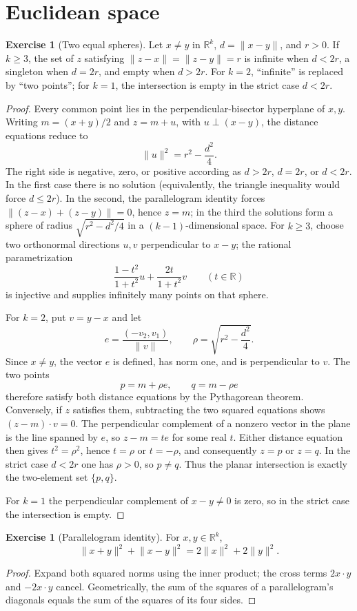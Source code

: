 \documentclass[12pt]{article}
\theoremstyle{definition}
\newtheorem{exercise}[theorem]{Exercise}
\newcommand{\R}{\mathbb R}
\newcommand{\norm}[1]{\lVert#1\rVert}
\begin{document}
\section{Euclidean space}
\begin{exercise}[Two equal spheres]
Let $x\ne y$ in $\R^k$, $d=\norm{x-y}$, and $r>0$.  If $k\ge3$, the
set of $z$ satisfying $\norm{z-x}=\norm{z-y}=r$ is infinite when
$d<2r$, a singleton when $d=2r$, and empty when $d>2r$.
For $k=2$, ``infinite'' is replaced by ``two points''; for $k=1$, the
intersection is empty in the strict case $d<2r$.
\end{exercise}
\begin{proof}
Every common point lies in the perpendicular-bisector hyperplane of
$x,y$.  Writing $m=(x+y)/2$ and $z=m+u$, with
$u\perp(x-y)$, the distance equations reduce to
\[
 \norm u^2=r^2-\frac{d^2}{4}.
\]
The right side is negative, zero, or positive according as $d>2r$,
$d=2r$, or $d<2r$.  In the first case there is no solution (equivalently,
the triangle inequality would force $d\le 2r$).  In the second, the
parallelogram identity forces $\norm{(z-x)+(z-y)}=0$, hence $z=m$; in the
third the solutions form a sphere
of radius $\sqrt{r^2-d^2/4}$ in a $(k-1)$-dimensional space.  For $k\ge3$,
choose two orthonormal directions $u,v$ perpendicular to $x-y$; the
rational parametrization
\[
 \frac{1-t^2}{1+t^2}u+\frac{2t}{1+t^2}v\qquad(t\in\R)
\]
is injective and supplies infinitely many points on that sphere.

For $k=2$, put $v=y-x$ and let
\[
 e=\frac{(-v_2,v_1)}{\norm v},\qquad
 \rho=\sqrt{r^2-\frac{d^2}{4}}.
\]
Since $x\ne y$, the vector $e$ is defined, has norm one, and is
perpendicular to $v$.  The two points
\[
 p=m+\rho e,\qquad q=m-\rho e
\]
therefore satisfy both distance equations by the Pythagorean theorem.
Conversely, if $z$ satisfies them, subtracting the two squared equations
shows $(z-m)\cdot v=0$.  The perpendicular complement of a nonzero vector
in the plane is the line spanned by $e$, so $z-m=te$ for some real $t$.
Either distance equation then gives $t^2=\rho^2$, hence $t=\rho$ or
$t=-\rho$, and consequently $z=p$ or $z=q$.  In the strict case
$d<2r$ one has $\rho>0$, so $p\ne q$.  Thus the planar intersection is
exactly the two-element set $\{p,q\}$.

For $k=1$ the perpendicular complement of $x-y\ne0$ is zero, so in the
strict case the intersection is empty.
\end{proof}

\begin{exercise}[Parallelogram identity]
For $x,y\in\R^k$,
\[
 \norm{x+y}^2+\norm{x-y}^2=2\norm x^2+2\norm y^2.
\]
\end{exercise}
\begin{proof}
Expand both squared norms using the inner product; the cross terms
$2x\cdot y$ and $-2x\cdot y$ cancel.  Geometrically, the sum of the
squares of a parallelogram's diagonals equals the sum of the squares of
its four sides.
\end{proof}
\end{document}
